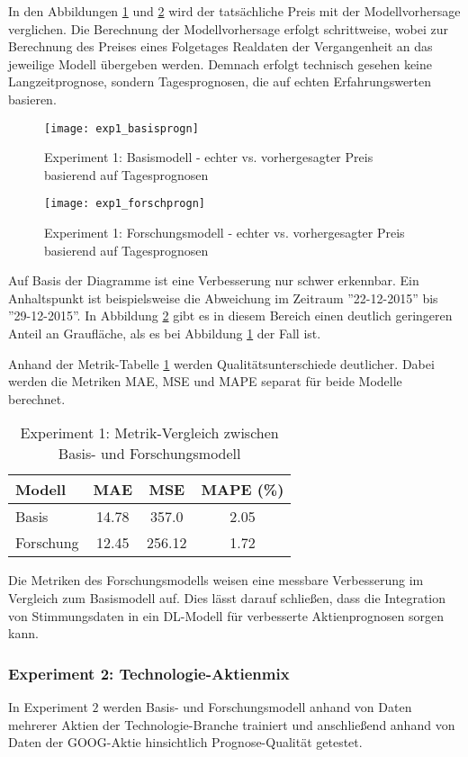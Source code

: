 In den Abbildungen \ref{fig:exp1_basisprogn} und \ref{fig:exp1_forschprogn} wird der tatsächliche Preis mit der Modellvorhersage verglichen. Die Berechnung der Modellvorhersage erfolgt schrittweise, wobei zur Berechnung des Preises eines Folgetages Realdaten der Vergangenheit an das jeweilige Modell übergeben werden. Demnach erfolgt technisch gesehen keine Langzeitprognose, sondern Tagesprognosen, die auf echten Erfahrungswerten basieren.
\begin{figure}[H]
	\texttt{[image: exp1\_basisprogn]}
	\caption{Experiment 1: Basismodell - echter vs. vorhergesagter Preis basierend auf Tagesprognosen}
	\label{fig:exp1_basisprogn}
\end{figure}
\begin{figure}[H]
	\texttt{[image: exp1\_forschprogn]}
	\caption{Experiment 1: Forschungsmodell - echter vs. vorhergesagter Preis basierend auf Tagesprognosen}
	\label{fig:exp1_forschprogn}
\end{figure}
Auf Basis der Diagramme ist eine Verbesserung nur schwer erkennbar. Ein Anhaltspunkt ist beispielsweise die Abweichung im Zeitraum ''22-12-2015'' bis ''29-12-2015''. In Abbildung \ref{fig:exp1_forschprogn} gibt es in diesem Bereich einen deutlich geringeren Anteil an Graufläche, als es bei Abbildung \ref{fig:exp1_basisprogn} der Fall ist.

Anhand der Metrik-Tabelle \ref{tbl:exp1_model_metrics} werden Qualitätsunterschiede deutlicher. Dabei werden die Metriken \ac{MAE}, \ac{MSE} und \ac{MAPE} separat für beide Modelle berechnet.
\begin{table}[H]
	\centering
	\caption{Experiment 1: Metrik-Vergleich zwischen Basis- und Forschungsmodell}
	\label{tbl:exp1_model_metrics}
	\begin{tabular}{lccc}
		\hline
		\textbf{Modell} & \textbf{MAE} & \textbf{MSE} & \textbf{MAPE (\%)} \\
		\hline
		Basis & 14.78 & 357.0 & 2.05 \\
		Forschung & 12.45 & 256.12 & 1.72 \\
		\hline
	\end{tabular}
\end{table}
Die Metriken des Forschungsmodells weisen eine messbare Verbesserung im Vergleich zum Basismodell auf. Dies lässt darauf schließen, dass die Integration von Stimmungsdaten in ein \ac{DL}-Modell für verbesserte Aktienprognosen sorgen kann.

\subsubsection{Experiment 2: Technologie-Aktienmix}\label{sec:evaluierung_exp2}
In Experiment $2$ werden Basis- und Forschungsmodell anhand von Daten mehrerer Aktien der Technologie-Branche trainiert und anschließend anhand von Daten der GOOG-Aktie hinsichtlich Prognose-Qualität getestet.


